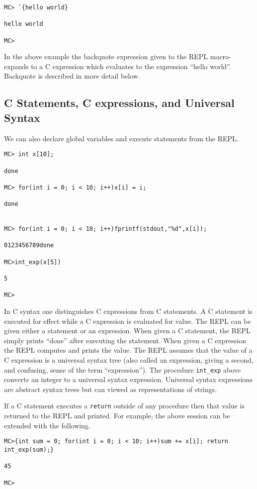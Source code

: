 \documentclass{article}
\begin{document}
\begin{verbatim}
MC> `{hello world}

hello world

MC>
\end{verbatim}

In the above example the backquote expression given to the REPL macro-expands to a C expression which evaluates to the expression ``hello world''.
Backquote is described in more detail below.

\subsection{C Statements, C expressions, and Universal Syntax}

We can also declare global variables and execute statements from the REPL.

\begin{verbatim}
MC> int x[10];

done

MC> for(int i = 0; i < 10; i++)x[i] = i;

done


MC> for(int i = 0; i < 10; i++)fprintf(stdout,"%d",x[i]);

0123456789done

MC>int_exp(x[5])

5

MC>
\end{verbatim}

In C syntax one distinguishes C expressions from C statements.  A C
statement is executed for effect while a C expression is evaluated for
value. The REPL can be given either a statement or an expression.  When
given a C statement, the REPL simply prints ``done'' after executing
the statement.
When given a C expression the REPL computes and prints
the value.  The REPL assumes that the value of a C expression
is a universal syntax tree (also called an expression, giving a second, and confusing,
sense of the term ``expression''). The procedure {\tt int\_exp} above
converts an integer to a universal syntax expression.  Universal syntax expressions are abstract
syntax trees but can viewed as representations of strings.

If a C statement executes a {\tt return} outside of any
procedure then that value is returned to the REPL and printed.
For example, the above session can be extended with the following.

\begin{verbatim}
MC>{int sum = 0; for(int i = 0; i < 10; i++)sum += x[i]; return int_exp(sum);}

45

MC>
\end{verbatim}
\end{document}
